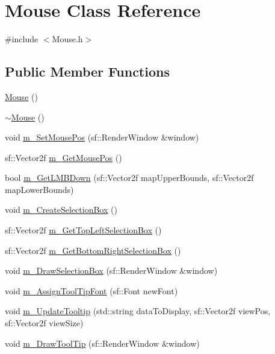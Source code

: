 \hypertarget{class_mouse}{}\section{Mouse Class Reference}
\label{class_mouse}


{\ttfamily \#include $<$Mouse.\+h$>$}

\subsection*{Public Member Functions}
\begin{DoxyCompactItemize}
\item 
\mbox{\hyperlink{class_mouse_a99024d3700d649ae19c1537b42a3e86d}{Mouse}} ()
\item 
\mbox{\hyperlink{class_mouse_afdf7d8abef29c10be77ead773f964f4f}{$\sim$\+Mouse}} ()
\item 
void \mbox{\hyperlink{class_mouse_a3bd0290c0d6d6d4c5024ad50aac97384}{m\+\_\+\+Set\+Mouse\+Pos}} (sf\+::\+Render\+Window \&window)
\item 
sf\+::\+Vector2f \mbox{\hyperlink{class_mouse_a3cecb21e004a7543f862adeb1f99668f}{m\+\_\+\+Get\+Mouse\+Pos}} ()
\item 
bool \mbox{\hyperlink{class_mouse_aa80965ead15bff808a7ac925808fe2ef}{m\+\_\+\+Get\+L\+M\+B\+Down}} (sf\+::\+Vector2f map\+Upper\+Bounds, sf\+::\+Vector2f map\+Lower\+Bounds)
\item 
void \mbox{\hyperlink{class_mouse_a04d21fe5944d4ba7460c74d0f6e56bb2}{m\+\_\+\+Create\+Selection\+Box}} ()
\item 
sf\+::\+Vector2f \mbox{\hyperlink{class_mouse_a11ee7162a00ebdde0fd089189507a0a1}{m\+\_\+\+Get\+Top\+Left\+Selection\+Box}} ()
\item 
sf\+::\+Vector2f \mbox{\hyperlink{class_mouse_a355172dc80aba80651fa57dd53efd68c}{m\+\_\+\+Get\+Bottom\+Right\+Selection\+Box}} ()
\item 
void \mbox{\hyperlink{class_mouse_a4562b08f5f21a00fead0196d5a4c34ea}{m\+\_\+\+Draw\+Selection\+Box}} (sf\+::\+Render\+Window \&window)
\item 
void \mbox{\hyperlink{class_mouse_ac668f6d214750b0c426486dd56de5bb0}{m\+\_\+\+Assign\+Tool\+Tip\+Font}} (sf\+::\+Font new\+Font)
\item 
void \mbox{\hyperlink{class_mouse_ab3b5422cbcf9eae16684998912f20b52}{m\+\_\+\+Update\+Tooltip}} (std\+::string data\+To\+Display, sf\+::\+Vector2f view\+Pos, sf\+::\+Vector2f view\+Size)
\item 
void \mbox{\hyperlink{class_mouse_ad1b3f025265e9f4823f19a7f4adc9add}{m\+\_\+\+Draw\+Tool\+Tip}} (sf\+::\+Render\+Window \&window)
\end{DoxyCompactItemize}


